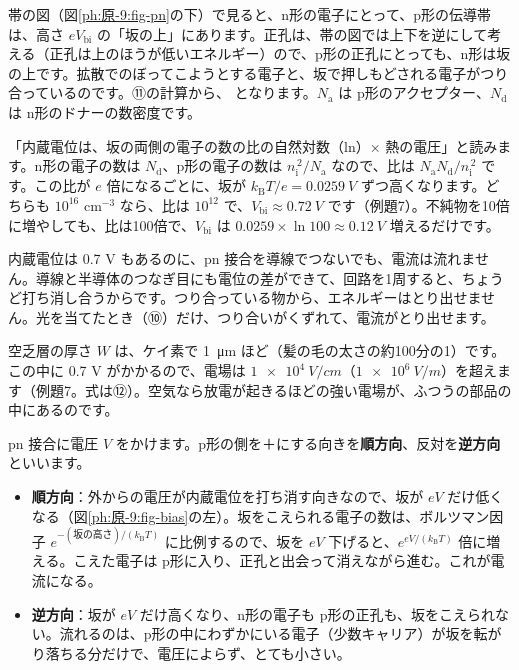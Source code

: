 \noindent 帯の図（図\ref{ph:原-9:fig-pn}の下）で見ると、n形の電子にとって、p形の伝導帯は、高さ $eV_{\mathrm{bi}}$ の「坂の上」にあります。正孔は、帯の図では上下を逆にして考える（正孔は上のほうが低いエネルギー）ので、p形の正孔にとっても、n形は坂の上です。拡散でのぼってこようとする電子と、坂で押しもどされる電子がつり合っているのです。⑪の計算から、
\label{ph:原-9:vbi}となります。$N_{\mathrm a}$ は p形のアクセプター、$N_{\mathrm d}$ は n形のドナーの数密度です。

\begin{phyomi}[$V_{\mathrm{bi}}=(k_{\mathrm B}T/e)\ln(N_{\mathrm a}N_{\mathrm d}/n_{\mathrm i}^{\,2})$]
「内蔵電位は、坂の両側の電子の数の比の自然対数（ln）× 熱の電圧」と読みます。n形の電子の数は $N_{\mathrm d}$、p形の電子の数は $n_{\mathrm i}^{\,2}/N_{\mathrm a}$ なので、比は $N_{\mathrm a}N_{\mathrm d}/n_{\mathrm i}^{\,2}$ です。この比が $e$ 倍になるごとに、坂が $k_{\mathrm B}T/e=\qty{0.0259}{V}$ ずつ高くなります。どちらも $10^{16}$ cm$^{-3}$ なら、比は $10^{12}$ で、$V_{\mathrm{bi}}\approx\qty{0.72}{V}$ です（例題7）。不純物を10倍に増やしても、比は100倍で、$V_{\mathrm{bi}}$ は $0.0259\times\ln100\approx\qty{0.12}{V}$ 増えるだけです。
\end{phyomi}

\begin{phmijika}
内蔵電位は 0.7 V もあるのに、pn 接合を導線でつないでも、電流は流れません。導線と半導体のつなぎ目にも電位の差ができて、回路を1周すると、ちょうど打ち消し合うからです。つり合っている物から、エネルギーはとり出せません。光を当てたとき（⑩）だけ、つり合いがくずれて、電流がとり出せます。
\end{phmijika}

\noindent 空乏層の厚さ $W$ は、ケイ素で \qty{1}{\micro m} ほど（髪の毛の太さの約100分の1）です。この中に 0.7 V がかかるので、電場は $\qty{1e4}{V/cm}$（$\qty{1e6}{V/m}$）を超えます（例題7。式は⑫）。空気なら放電が起きるほどの強い電場が、ふつうの部品の中にあるのです。

\label{ph:原-9:sec7}
pn 接合に電圧 $V$ をかけます。p形の側を＋にする向きを\textbf{順方向}、反対を\textbf{逆方向}といいます。

\begin{itemize}[label={\color{bkTheme}●}, leftmargin=1.6\zw, itemsep=1pt, topsep=2pt]
\item \textbf{順方向}：外からの電圧が内蔵電位を打ち消す向きなので、坂が $eV$ だけ低くなる（図\ref{ph:原-9:fig-bias}の左）。坂をこえられる電子の数は、ボルツマン因子 $e^{-(\text{坂の高さ})/(k_{\mathrm B}T)}$ に比例するので、坂を $eV$ 下げると、$e^{eV/(k_{\mathrm B}T)}$ 倍に増える。こえた電子は p形に入り、正孔と出会って消えながら進む。これが電流になる。
\item \textbf{逆方向}：坂が $eV$ だけ高くなり、n形の電子も p形の正孔も、坂をこえられない。流れるのは、p形の中にわずかにいる電子（少数キャリア）が坂を転がり落ちる分だけで、電圧によらず、とても小さい。
\end{itemize}

